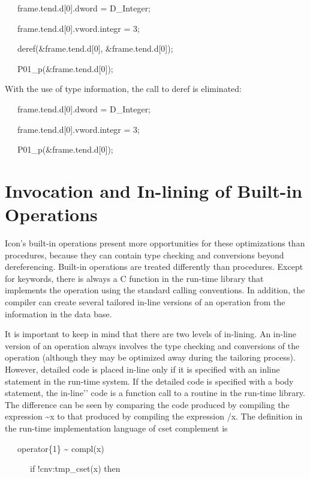 {\ttfamily\mdseries
\ \ \ frame.tend.d[0].dword = D\_Integer;}

{\ttfamily\mdseries
\ \ \ frame.tend.d[0].vword.integr = 3;}

{\ttfamily\mdseries
\ \ \ deref(\&frame.tend.d[0], \&frame.tend.d[0]);}

{\ttfamily\mdseries
\ \ \ P01\_p(\&frame.tend.d[0]);}


With the use of type information, the call to deref is eliminated: 

{\ttfamily\mdseries
\ \ \ frame.tend.d[0].dword = D\_Integer;}

{\ttfamily\mdseries
\ \ \ frame.tend.d[0].vword.integr = 3;}

{\ttfamily\mdseries
\ \ \ P01\_p(\&frame.tend.d[0]);}


\section{Invocation and In-lining of Built-in Operations}

Icon's built-in operations present more opportunities for these
optimizations than procedures, because they can contain type checking
and conversions beyond dereferencing. Built-in operations are treated
differently than procedures. Except for keywords, there is always a C
function in the run-time library that implements the operation using
the standard calling conventions. In addition, the compiler can create
several tailored in-line versions of an operation from the information
in the data base.

It is important to keep in mind that there are two levels of
in-lining. An in-line version of an operation always involves the type
checking and conversions of the operation (although they may be
optimized away during the tailoring process). However, detailed code
is placed in-line only if it is specified with an inline statement in
the run-time system. If the detailed code is specified with a body
statement, the {\textasciigrave}{\textasciigrave}in-line'{}' code is a
function call to a routine in the run-time library. The difference can
be seen by comparing the code produced by compiling the expression
\~{}x to that produced by compiling the expression /x. The definition
in the run-time implementation language of cset complement is

{\ttfamily\mdseries
\ \ \ operator\{1\} \~{} compl(x)}

{\ttfamily\mdseries
\ \ \ \ \ \ if !cnv:tmp\_cset(x) then}

